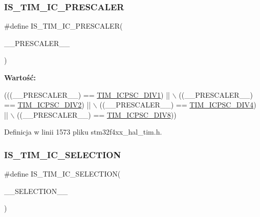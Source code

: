 \subsubsection{\texorpdfstring{I\+S\+\_\+\+T\+I\+M\+\_\+\+I\+C\+\_\+\+P\+R\+E\+S\+C\+A\+L\+ER}{IS\_TIM\_IC\_PRESCALER}}
{\footnotesize\ttfamily \#define I\+S\+\_\+\+T\+I\+M\+\_\+\+I\+C\+\_\+\+P\+R\+E\+S\+C\+A\+L\+ER(\begin{DoxyParamCaption}\item[{}]{\+\_\+\+\_\+\+P\+R\+E\+S\+C\+A\+L\+E\+R\+\_\+\+\_\+ }\end{DoxyParamCaption})}

{\bfseries Wartość\+:}
\begin{DoxyCode}
(((\_\_PRESCALER\_\_) == \hyperlink{group___t_i_m___input___capture___prescaler_ga8acb44abe3147d883685c1f9f1ce410e}{TIM\_ICPSC\_DIV1}) || \(\backslash\)
                                            ((\_\_PRESCALER\_\_) == \hyperlink{group___t_i_m___input___capture___prescaler_ga1d8a7b66add914e2ddd910d2d700978f}{TIM\_ICPSC\_DIV2}) || \(\backslash\)
                                            ((\_\_PRESCALER\_\_) == \hyperlink{group___t_i_m___input___capture___prescaler_gaf5a675046430fa0f0c95b0dac612828f}{TIM\_ICPSC\_DIV4}) || \(\backslash\)
                                            ((\_\_PRESCALER\_\_) == \hyperlink{group___t_i_m___input___capture___prescaler_ga5086cb03c89a5c67b199d20b605f00cb}{TIM\_ICPSC\_DIV8}))
\end{DoxyCode}


Definicja w linii 1573 pliku stm32f4xx\+\_\+hal\+\_\+tim.\+h.

\mbox{\label{group___t_i_m___private___macros_ga3b370e1454433066201e9f09cb47173f}} 
\subsubsection{\texorpdfstring{I\+S\+\_\+\+T\+I\+M\+\_\+\+I\+C\+\_\+\+S\+E\+L\+E\+C\+T\+I\+ON}{IS\_TIM\_IC\_SELECTION}}
{\footnotesize\ttfamily \#define I\+S\+\_\+\+T\+I\+M\+\_\+\+I\+C\+\_\+\+S\+E\+L\+E\+C\+T\+I\+ON(\begin{DoxyParamCaption}\item[{}]{\+\_\+\+\_\+\+S\+E\+L\+E\+C\+T\+I\+O\+N\+\_\+\+\_\+ }\end{DoxyParamCaption})}


